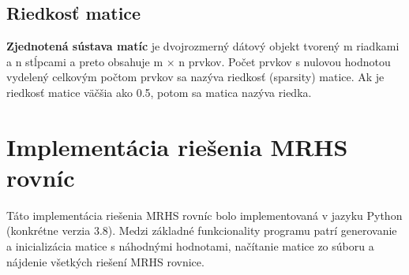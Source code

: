 \subsection{Riedkosť matice}
\noindent \textbf{Zjednotená sústava matíc} je dvojrozmerný dátový objekt tvorený m riadkami a n stĺpcami a preto obsahuje m × n prvkov. Počet prvkov s nulovou hodnotou vydelený celkovým
počtom prvkov sa nazýva riedkosť (sparsity) matice. Ak je riedkosť matice
väčšia ako 0.5, potom sa matica nazýva riedka.

\section{Implementácia riešenia MRHS rovníc}
Táto implementácia riešenia MRHS rovníc bolo implementovaná v jazyku Python (konkrétne verzia 3.8). Medzi základné funkcionality programu patrí generovanie a inicializácia matice s náhodnými hodnotami, načítanie matice zo súboru a nájdenie všetkých riešení MRHS rovnice.

